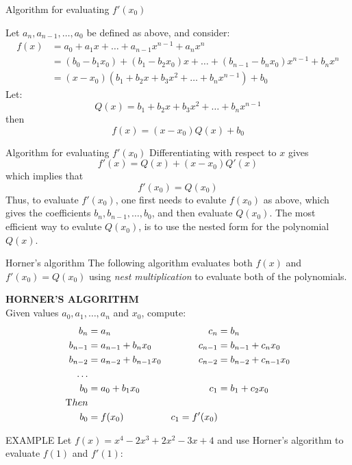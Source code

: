 \documentclass[12pt]{beamer}
\begin{document}
\begin{frame}{Algorithm for evaluating $f'(x_0)$} 

Let $a_n, a_{n-1}, \dots, a_0$ be defined as above, and consider: 
\begin{align*} 
f(x) &= a_0 + a_1 x + \dots + a_{n-1} x^{n-1} + a_n x^{n}  \\ 
&= (b_{0} - b_{1}x_{0}) + (b_{1} - b_{2}x_{0})x + \dots + (b_{n-1} - b_nx_0)x^{n-1} + b_nx^{n}   \\ 
&=  (x-x_0) (b_1 + b_2x + b_3 x^2 + \dots + b_n x^{n-1}) + b_0  
\end{align*} 
Let:
\[
Q(x) = b_1 + b_2x + b_3 x^2 + \dots + b_n x^{n-1} 
\]
\noindent 
then 
\[
f(x)= (x-x_0)Q(x) + b_0  
\]
\end{frame} 

\begin{frame}{Algorithm for evaluating $f'(x_0)$} 
Differentiating with respect to $x$ gives 
\[ 
f'(x) = Q(x) + (x-x_0) Q'(x) 
\] 
\noindent 
which implies that 
\[
f'(x_0) = Q(x_0) 
\]
\noindent 
Thus, to evaluate $f'(x_0)$, one first needs to evalute $f(x_0)$ as above, which gives the coefficients $b_n, b_{n-1}, \dots, b_0$, and then evaluate $Q(x_0)$. The most efficient way to evalute $Q(x_0)$, is to use the nested form for the polynomial $Q(x)$. 
\end{frame}

\begin{frame}{Horner's algorithm} 
The following algorithm evaluates both $f(x)$ and $f'(x_0)= Q(x_0)$ using {\it nest multiplication} to evaluate both of the polynomials. 
\noindent 

{\bf HORNER'S ALGORITHM} 
\\
Given values $a_0, a_1, \dots, a_n$ and $x_0$, compute: 
\begin{align*} 
b_n &= a_n &  c_n &= b_n \\ 
b_{n-1} &= a_{n-1} + b_{n} x_0 & c_{n-1} &= b_{n-1} + c_n x_0 \\ 
b_{n-2} &= a_{n-2} + b_{n-1} x_0 & c_{n-2} &= b_{n-2} + c_{n-1} x_0 \\ 
\dots \\ 
b_{0} &= a_{0} + b_{1} x_0 & c_{1} &= b_{1} + c_{2} x_{0} \\ 
{\mbox Then } \\ 
b_0 &= f(x_0) & c_1 = f'(x_0) \\  
\end{align*} 
\end{frame} 

\begin{frame}{EXAMPLE} 
Let $f(x) = x^4 - 2 x^3 + 2 x^2 -3x + 4$ and use Horner's algorithm to evaluate $f(1)$ and $f'(1)$: 
\vspace{3 in}
\end{frame} 
\end{document}
